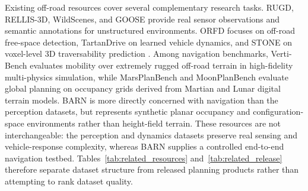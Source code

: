 \documentclass[11pt]{article}
\begin{document}
Existing off-road resources cover several complementary research tasks. RUGD,
RELLIS-3D, WildScenes, and GOOSE provide real sensor observations and semantic
annotations for unstructured environments\cite{rugd,rellis3d,wildscenes,goose}.
ORFD focuses on off-road free-space detection, TartanDrive on learned vehicle
dynamics, and STONE on voxel-level 3D traversability prediction
\cite{orfd,tartandrive,stone}. Among navigation benchmarks, Verti-Bench evaluates
mobility over extremely rugged off-road terrain in high-fidelity multi-physics
simulation\cite{vertibench}, while MarsPlanBench and MoonPlanBench evaluate
global planning on occupancy grids derived from Martian and Lunar digital terrain
models\cite{planetarypathbench}. BARN is more directly concerned with navigation
than the perception datasets, but represents synthetic planar occupancy and
configuration-space environments rather than height-field terrain\cite{barn}.
These resources are not interchangeable: the perception and dynamics datasets
preserve real sensing and vehicle-response complexity, whereas BARN supplies a
controlled end-to-end navigation testbed. Tables~\ref{tab:related_resources}
and~\ref{tab:related_release} therefore separate dataset structure from released
planning products rather than attempting to rank dataset quality.
\end{document}
